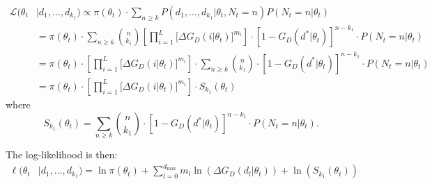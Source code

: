 \documentclass{article}
\begin{document}
\begin{equation}\label{eq2}
    \begin{aligned}
    \mathcal{L}(\theta_t & | d_1, \dots, d_{k_1})  \propto  \pi(\theta_t) \cdot \sum\limits_{n \geq k} P(d_1, \dots, d_{k_1} |\theta_t, N_t = n) P(N_t = n | \theta_t) \\
    & = \pi(\theta_t) \cdot \sum\limits_{n \geq k} \binom{n}{k_1}\left[ \prod\limits_{i=1}^L \big[\Delta G_D(i|\theta_t)\big]^{m_i} \right]  \cdot \left[1 - G_D(d^*|\theta_t)\right]^{n - k_1} \cdot P(N_t = n|\theta_t) 
    \\ & = \pi(\theta_t) \cdot \left[ \prod\limits_{i=1}^L \big[\Delta G_D(i|\theta_t)\big]^{m_i} \right]\cdot  \sum\limits_{n \geq k} \binom{n}{k_1}   \cdot \left[1 - G_D(d^*|\theta_t)\right]^{n - k_1} \cdot P(N_t = n|\theta_t)
    \\ & = \pi(\theta_t) \cdot\left[ \prod\limits_{i=1}^L \big[\Delta G_D(i|\theta_t)\big]^{m_i} \right]\cdot  S_{k_1}(\theta_t)
    \end{aligned}
\end{equation}
where
\begin{equation}\label{snk}
    S_{k_1}(\theta_t) = \sum\limits_{n \geq k} \binom{n}{k_1}   \cdot \left[1 - G_D(d^*|\theta_t)\right]^{n - k_1} \cdot P(N_t = n|\theta_t).
\end{equation}

The log-likelihood is then:
\begin{equation}
\begin{aligned}
    \ell(\theta_t & | d_1, \dots, d_{k_1}) = 
    \ln{\pi(\theta_t)} + \sum\limits_{l=0}^{d_{\max}} m_l\ln{\left(\Delta G_D(d_l|\theta_t)\right)} + \ln{\left(S_{k_1}(\theta_t)\right)} 
\end{aligned}
\end{equation}
\end{document}
